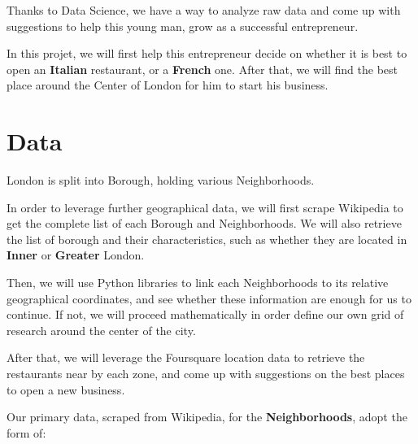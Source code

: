 \documentclass[11pt]{article}
\begin{document}
Thanks to Data Science, we have a way to analyze raw data and come up
with suggestions to help this young man, grow as a successful
entrepreneur.

In this projet, we will first help this entrepreneur decide on whether
it is best to open an \textbf{Italian} restaurant, or a \textbf{French}
one. After that, we will find the best place around the Center of London
for him to start his business.


    \hypertarget{data}{%
\section{\texorpdfstring{Data }{Data }}\label{data}}

London is split into Borough, holding various Neighborhoods.

In order to leverage further geographical data, we will first scrape
Wikipedia to get the complete list of each Borough and Neighborhoods. We
will also retrieve the list of borough and their characteristics, such
as whether they are located in \textbf{Inner} or \textbf{Greater}
London.

Then, we will use Python libraries to link each Neighborhoods to its
relative geographical coordinates, and see whether these information are
enough for us to continue. If not, we will proceed mathematically in
order define our own grid of research around the center of the city.

After that, we will leverage the Foursquare location data to retrieve
the restaurants near by each zone, and come up with suggestions on the
best places to open a new business.

Our primary data, scraped from Wikipedia, for the
\textbf{Neighborhoods}, adopt the form of:

\end{document}
